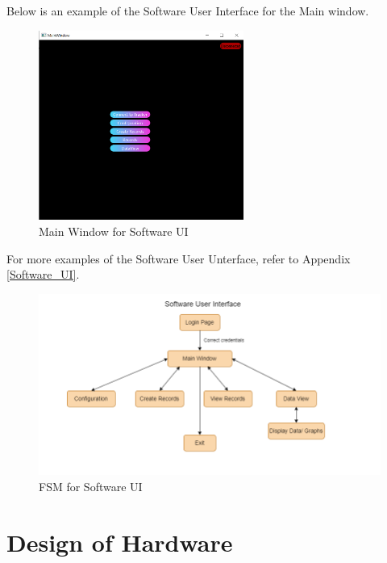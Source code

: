 \documentclass[12pt, titlepage]{article}
\begin{document}
Below is an example of the Software User Interface for the Main window.
\begin{figure}[H]
	\begin{center}
		 \includegraphics[width=0.6\textwidth]{MainWindow}
		\caption{Main Window for Software UI}
		\label{MainWindow} 
	\end{center}
\end{figure}

For more examples of the Software User Unterface, refer to Appendix \ref{Software_UI}.

\begin{figure}[H]
	\begin{center}
		 \includegraphics[width=1\textwidth]{SoftwareUI_FSM}
		\caption{FSM for Software UI}
		\label{SoftwareUI_FSM} 
	\end{center}
\end{figure}

\section{Design of Hardware}
\end{document}
